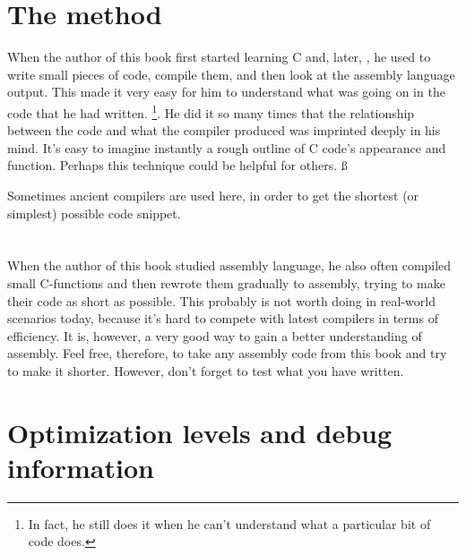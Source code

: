 \section{The method}

When the author of this book first started learning C and, later, \Cpp, he used to write small pieces of code, compile them,
and then look at the assembly language output. This made it very easy for him to understand what was going on in the code that he had written.
\footnote{In fact, he still does it when he can't understand what a particular bit of code does.}.
He did it so many times that the relationship between the \CCpp code and what the compiler produced was imprinted deeply in his mind.
It's easy to imagine instantly a rough outline of C code's appearance and function.
Perhaps this technique could be helpful for others.
ß

Sometimes ancient compilers are used here, in order to get the shortest (or simplest) possible code snippet.

\section*{\Exercises}

When the author of this book studied assembly language, he also often compiled small C-functions and then rewrote
them gradually to assembly, trying to make their code as short as possible.
This probably is not worth doing in real-world scenarios today,
because it's hard to compete with latest compilers in terms of efficiency. It is, however, a very good way to gain a better understanding of assembly.
Feel free, therefore, to take any assembly code from this book and try to make it shorter.
However, don't forget to test what you have written.

\section*{Optimization levels and debug information}

